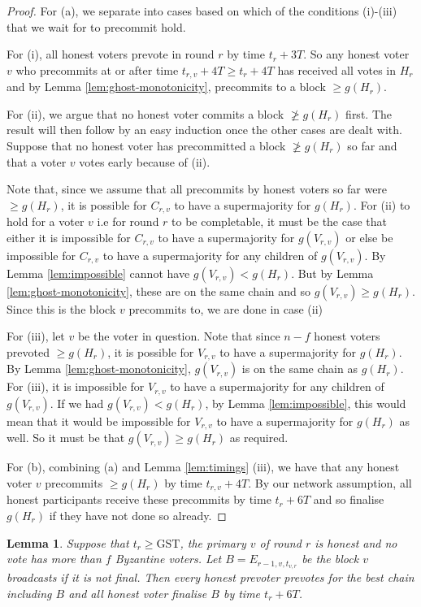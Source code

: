 \documentclass{article}
\newtheorem{lemma}[theorem]{Lemma}
\def\GST{\mathrm{GST}}
\begin{document}
\begin{proof} For (a), we separate into cases based on which of the conditions (i)-(iii) that we wait for to precommit hold.

For (i), all honest voters prevote in round $r$ by time $t_r+3T$. So any honest voter $v$ who precommits at or after time $t_{r,v}+4T \geq t_r+4T$ has received all votes in $H_r$ and by Lemma \ref{lem:ghost-monotonicity}, precommits to a block $\geq g(H_r)$.

For (ii), we argue that no honest voter commits a block $\not\geq g(H_r)$ first. The result will then follow by an easy induction once the other cases are dealt with. Suppose that no honest voter has precommitted a block $\not \geq g(H_r)$ so far and that a voter $v$ votes early because of (ii).

Note that, since we assume that all precommits by honest voters so far were $\geq g(H_r)$, it is possible for $C_{r,v}$ to have a supermajority for $g(H_r)$.
For (ii) to hold for a voter $v$ i.e for round $r$ to be completable, it must be the case that either it is impossible for $C_{r,v}$ to have a supermajority for $g(V_{r,v})$ or else be impossible for $C_{r,v}$ to have a supermajority for any children of $g(V_{r,v})$. By Lemma \ref{lem:impossible} cannot have $g(V_{r,v}) < g(H_r)$.
But by Lemma \ref{lem:ghost-monotonicity}, these are on the same chain and so $g(V_{r,v}) \geq g(H_r)$. Since this is the block $v$ precommits to, we are done in case (ii)

For (iii), let $v$ be the voter in question. Note that since $n-f$ honest voters prevoted $\geq g(H_r)$, it is possible for $V_{r,v}$ to have a supermajority for $g(H_r)$. By Lemma \ref{lem:ghost-monotonicity}, $g(V_{r,v})$ is on the same chain as $g(H_r)$.
For (iii), it is impossible for $V_{r,v}$ to have a supermajority for any children of $g(V_{r,v})$. If we had $g(V_{r,v}) < g(H_r)$, by Lemma \ref{lem:impossible}, this would mean that it would be impossible for $V_{r,v}$ to have a supermajority for $g(H_r)$ as well. So it must be that $g(V_{r,v} )\geq g(H_r)$ as required.

For (b), combining (a) and Lemma \ref{lem:timings} (iii), we have that any honest voter $v$ precommits $\geq g(H_r)$ by time $t_{r,v}+4T$. By our network assumption, all honest participants receive these precommits by time $t_r+6T$ and so finalise $g(H_r)$ if they have not done so already.
\end{proof}

\begin{lemma} \label{lem:primary-finalises}
 Suppose that $t_r \geq \GST$, the primary $v$ of round $r$ is honest and no vote has more than $f$ Byzantine voters. Let $B=E_{r-1,v,t_{v,r}}$ be the block $v$ broadcasts if it is not final. Then every honest prevoter prevotes for the best chain including $B$ and all honest voter finalise $B$ by time $t_r+6T$.
 \end{lemma}
\end{document}
